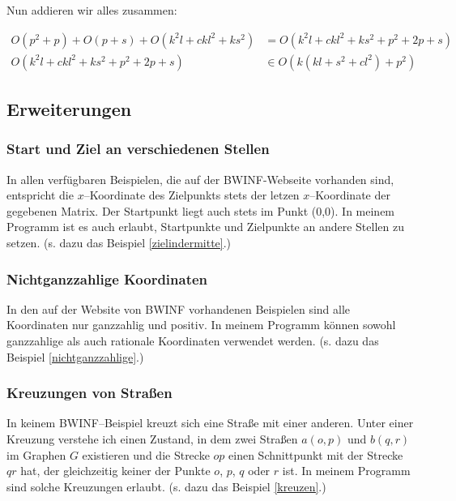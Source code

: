 \documentclass[a4paper,10pt,ngerman]{scrartcl}
\begin{document}
Nun addieren wir alles zusammen:

\begin{align*}
O(p^2 + p) + O(p + s) + O(k^2l + ckl^2 + ks^2) &= O(k^2l + ckl^2 + ks^2 + p^2 + 2p + s)\\
O(k^2l + ckl^2 + ks^2 + p^2 + 2p + s) &\in O(k(kl + s^2 + cl^2) + p^2)
\end{align*}

\newpage
\subsection{Erweiterungen}

\subsubsection{Start und Ziel an verschiedenen Stellen}
In allen verfügbaren Beispielen, die auf der BWINF-Webseite vorhanden sind,
entspricht die $x$--Koordinate des Zielpunkts stets der letzen $x$--Koordinate der gegebenen Matrix.
Der Startpunkt liegt auch stets im Punkt (0,0).
In meinem Programm ist es auch erlaubt, Startpunkte und Zielpunkte an andere Stellen zu setzen.
(s. dazu das Beispiel \ref{zielindermitte}.)

\subsubsection{Nichtganzzahlige Koordinaten}
In den auf der Website von BWINF vorhandenen Beispielen sind alle Koordinaten nur ganzzahlig und positiv.
In meinem Programm können sowohl ganzzahlige als auch rationale Koordinaten verwendet werden. 
(s. dazu das Beispiel \ref{nichtganzzahlige}.)

\subsubsection{Kreuzungen von Straßen}
In keinem BWINF--Beispiel kreuzt sich eine Straße mit einer anderen. 
Unter einer Kreuzung verstehe ich einen Zustand, in dem zwei Straßen $a(o,p)$ und $b(q,r)$ im Graphen $G$
existieren und die Strecke $op$ einen Schnittpunkt mit der Strecke $qr$ hat, der gleichzeitig
keiner der Punkte $o$, $p$, $q$ oder $r$ ist.
In meinem Programm sind solche Kreuzungen erlaubt.
(s. dazu das Beispiel \ref{kreuzen}.)
\end{document}
